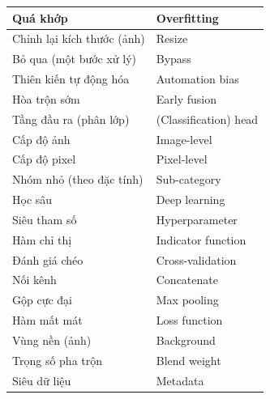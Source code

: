 \begin{longtable}{|>{\raggedright\arraybackslash}p{5.2cm}|p{8.8cm}|}
Quá khớp & Overfitting \\ \hline
Chỉnh lại kích thước (ảnh) & Resize \\ \hline
Bỏ qua (một bước xử lý) & Bypass \\ \hline
Thiên kiến tự động hóa & Automation bias \\ \hline
Hòa trộn sớm & Early fusion \\ \hline
Tầng đầu ra (phân lớp) & (Classification) head \\ \hline
Cấp độ ảnh & Image-level \\ \hline
Cấp độ pixel & Pixel-level \\ \hline
Nhóm nhỏ (theo đặc tính) & Sub-category \\ \hline
Học sâu & Deep learning \\ \hline
Siêu tham số & Hyperparameter \\ \hline
Hàm chỉ thị & Indicator function \\ \hline
Đánh giá chéo & Cross-validation \\ \hline
Nối kênh & Concatenate \\ \hline
Gộp cực đại & Max pooling \\ \hline
Hàm mất mát & Loss function \\ \hline
Vùng nền (ảnh) & Background \\ \hline
Trọng số pha trộn & Blend weight \\ \hline
Siêu dữ liệu & Metadata \\ \hline
\end{longtable}
